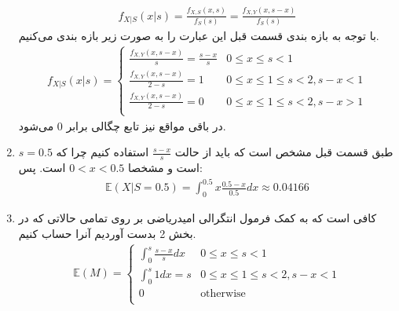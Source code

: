 \begin{enumerate}
\begin{gather*}
        f_{X|S}(x | s) = \frac{f_{X,S}(x, s)}{f_S(s)} = \frac{f_{X,Y}(x, s - x)}{f_S(s)}
    \end{gather*}
    با توجه به بازه بندی قسمت قبل این عبارت را به صورت زیر بازه بندی می‌کنیم.
    \begin{gather*}
        f_{X|S}(x | s) =
            \begin{cases}
                \frac{f_{X,Y}(x, s - x)}{s} = \frac{s - x}{s} & 0 \le x \le s < 1\\
                \frac{f_{X,Y}(x, s - x)}{2 - s} = 1 & 0 \le x \le 1 \le s < 2, s - x < 1\\
                \frac{f_{X,Y}(x, s - x)}{2 - s} = 0 & 0 \le x \le 1 \le s < 2, s - x > 1\\
            \end{cases}
    \end{gather*}
    در باقی مواقع نیز تابع چگالی برابر 0 می‌شود.
    \item طبق قسمت قبل مشخص است که باید از حالت
    $\frac{s - x}{s}$
    استفاده کنیم چرا که
    $s = 0.5$
    است و مشخصا
    $0 < x < 0.5$
    است. پس:
    \begin{gather*}
        \mathbb{E}(X | S = 0.5) = \int_{0}^{0.5} x \frac{0.5 - x}{0.5} dx \approx 0.04166
    \end{gather*}
    \item کافی است که به کمک فرمول انتگرالی امیدریاضی بر روی تمامی حالاتی که در بخش 2 بدست آوردیم
    آنرا حساب کنیم.
    \begin{gather*}
        \mathbb{E}(M) =
            \begin{cases}
                \int_{0}^{s} \frac{s - x}{s} dx & 0 \le x \le s < 1\\
                \int_{0}^{s} 1 dx = s & 0 \le x \le 1 \le s < 2, s - x < 1\\
                0 & \text{otherwise}\\
            \end{cases}
    \end{gather*}
\end{enumerate}